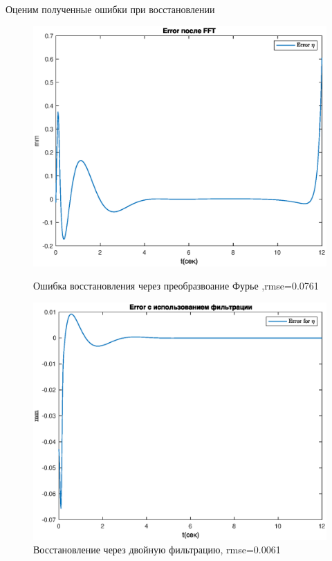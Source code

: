\documentclass[a4paper,12pt, openany]{book}
\theoremstyle{plain} %
\theoremstyle{definition} %
\theoremstyle{remark} %
\numberwithin{equation}{chapter}
\begin{document}
{Оценим полученные ошибки при восстановлении

\begin{figure}[h!]
    \begin{center}
        \begin{minipage}[h]{0.48\linewidth}
            \includegraphics[width=1\linewidth]{err_furier_model.eps}
            \caption{Ошибка восстановления через преобразвоание Фурье ,rmse=0.0761}
        \end{minipage}
        \hfill
        \begin{minipage}[h]{0.48\linewidth}
            \includegraphics[width=1\linewidth]{err_double_filter_model.eps}
            \caption{Восстановление через двойную фильтрацию, rmse=0.0061}
        \end{minipage}
    \end{center}
\end{figure}

}
\end{document}
